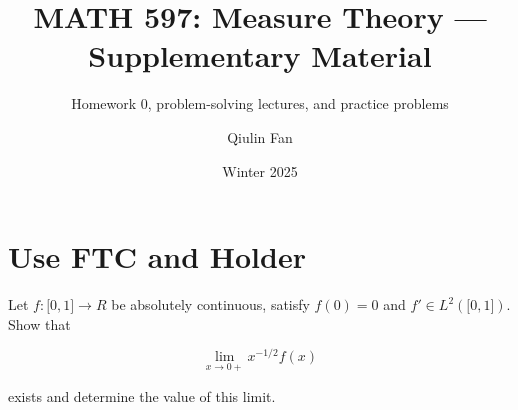 \documentclass{qlnotes-export}
\title{MATH 597: Measure Theory --- Supplementary Material}
\subtitle{Homework 0, problem-solving lectures, and practice problems}
\author{Qiulin Fan}
\date{Winter 2025}
\begin{document}
\mainmatter
\chapter{Use FTC and Holder}\label{use-ftc-and-holder}

Let \(f:\lbrack 0,1\rbrack\rightarrow R\) be absolutely continuous, satisfy \(f(0) = 0\) and \(f' \in L^{2}(\lbrack 0,1\rbrack)\). Show that

\[\lim\limits_{x\rightarrow 0 +}x^{- 1/2}f(x)\]

exists and determine the value of this limit.
\end{document}
